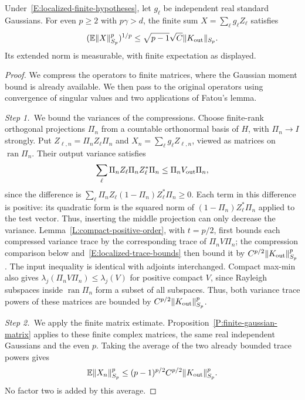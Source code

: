 \begin{corollary}\label{C:finite-gaussian-operators}
  Under~\eqref{E:localized-finite-hypotheses}, let $g_\ell$ be independent real
  standard Gaussians. For even $p \ge 2$ with $p\gamma > d$, the finite sum $X =
  \sum_\ell g_\ell Z_\ell$ satisfies
  \begin{equation}\label{E:finite-gaussian-operator-bound}
    (\mathbb{E}\|X\|_{S_p}^p)^{1/p}
    \le\sqrt{p-1}\sqrt C\|K_{\rm out}\|_{S_p}.
  \end{equation}
  Its extended norm is measurable, with finite expectation as displayed.
\end{corollary}

\begin{proof}
  We compress the operators to finite matrices, where the Gaussian moment
  bound is already available. We then pass to the original operators using
  convergence of singular values and two applications of Fatou's lemma.

  \medskip
  \noindent\textit{Step 1.~}We bound the variances of the compressions.
  Choose finite-rank orthogonal projections $\Pi_n$ from a countable orthonormal
  basis of $H$, with $\Pi_n \to I$ strongly. Put $Z_{\ell,n} = \Pi_nZ_\ell\Pi_n$
  and $X_n = \sum_\ell g_\ell Z_{\ell,n}$, viewed as matrices on
  $\operatorname{ran}\Pi_n$. Their output variance satisfies
  \[
    \sum_\ell\Pi_nZ_\ell\Pi_nZ_\ell^*\Pi_n
    \le\Pi_nV_{\rm out}\Pi_n,
  \]
  since the difference is $\sum_\ell\Pi_nZ_\ell(1-\Pi_n)Z_\ell^*\Pi_n \ge 0$.
  Each term in this difference is positive: its quadratic form is the squared
  norm of $(1-\Pi_n)Z_\ell^*\Pi_n$ applied to the test vector. Thus, inserting
  the middle projection can only decrease the variance.
  Lemma~\ref{L:compact-positive-order}, with $t=p/2$, first bounds each
  compressed variance trace by the corresponding trace of $\Pi_nV\Pi_n$; the
  compression comparison below and~\eqref{E:localized-trace-bounds} then bound
  it by $C^{p/2}\|K_{\rm out}\|_{S_p}^p$.
  The input inequality is identical with adjoints interchanged. Compact max-min
  also gives $\lambda_j(\Pi_nV\Pi_n) \le \lambda_j(V)$ for positive compact $V$,
  since Rayleigh subspaces inside $\operatorname{ran}\Pi_n$ form a subset of all
  subspaces. Thus, both variance trace powers of these matrices are bounded by
  $C^{p/2}\|K_{\rm out}\|_{S_p}^p$.


  \medskip
  \noindent\textit{Step 2.~}We apply the finite matrix estimate.
  Proposition~\ref{P:finite-gaussian-matrix} applies to these finite complex
  matrices, the same real independent Gaussians and the even $p$. Taking the
  average of the two already bounded trace powers gives
  \begin{equation}\label{E:finite-gaussian-compression-bound}
    \mathbb{E}\|X_n\|_{S_p}^p
    \le(p-1)^{p/2}C^{p/2}\|K_{\rm out}\|_{S_p}^p.
  \end{equation}
  No factor two is added by this average.


\end{proof}
